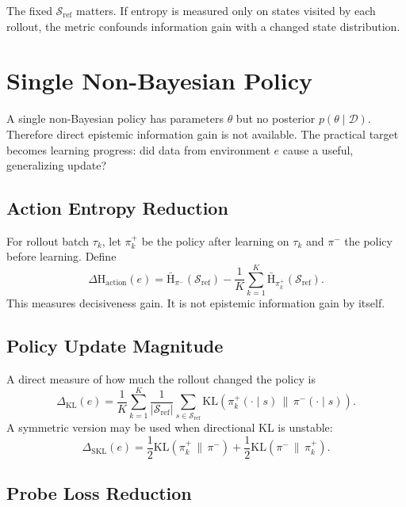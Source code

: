 \documentclass[11pt]{article}
\newcommand{\D}{\mathcal{D}}
\newcommand{\Sref}{\mathcal{S}_{\mathrm{ref}}}
\newcommand{\KL}{\mathrm{KL}}
\newcommand{\Hent}{\mathrm{H}}
\begin{document}
The fixed $\Sref$ matters. If entropy is measured only on states visited by each
rollout, the metric confounds information gain with a changed state
distribution.

\section{Single Non-Bayesian Policy}

A single non-Bayesian policy has parameters $\theta$ but no posterior
$p(\theta \mid \D)$. Therefore direct epistemic information gain is not
available. The practical target becomes learning progress: did data from
environment $e$ cause a useful, generalizing update?

\subsection{Action Entropy Reduction}

For rollout batch $\tau_k$, let $\pi_k^+$ be the policy after learning on
$\tau_k$ and $\pi^-$ the policy before learning. Define
\begin{equation}
  \Delta \Hent_{\mathrm{action}}(e)
  =
  \bar{\Hent}_{\pi^-}(\Sref)
  -
  \frac{1}{K}\sum_{k=1}^{K}
  \bar{\Hent}_{\pi_k^+}(\Sref).
\end{equation}
This measures decisiveness gain. It is not epistemic information gain by
itself.

\subsection{Policy Update Magnitude}

A direct measure of how much the rollout changed the policy is
\begin{equation}
  \Delta_{\mathrm{KL}}(e)
  =
  \frac{1}{K}\sum_{k=1}^{K}
  \frac{1}{|\Sref|}\sum_{s \in \Sref}
  \KL\left(\pi_k^+(\cdot \mid s)\,\|\,\pi^-(\cdot \mid s)\right).
\end{equation}
A symmetric version may be used when directional KL is unstable:
\begin{equation}
  \Delta_{\mathrm{SKL}}(e)
  =
  \frac{1}{2}
  \KL(\pi_k^+\,\|\,\pi^-)
  +
  \frac{1}{2}
  \KL(\pi^-\,\|\,\pi_k^+).
\end{equation}

\subsection{Probe Loss Reduction}
\end{document}

